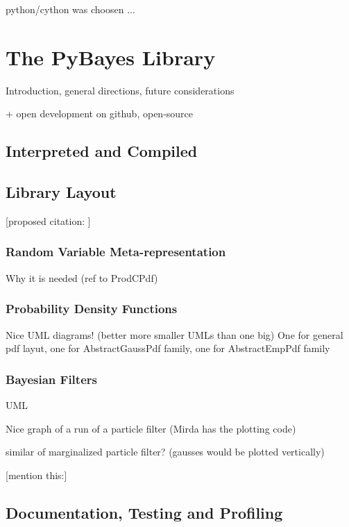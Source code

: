 \documentclass[a4paper,12pt,oneside]{report}
\begin{document}
python/cython was choosen ...


\chapter{The PyBayes Library}

Introduction, general directions, future considerations

+ open development on github, open-source

\section{Interpreted and Compiled}

\section{Library Layout}

[proposed citation: \cite{Smi:05}]

\subsection{Random Variable Meta-representation}

Why it is needed (ref to ProdCPdf)

\subsection{Probability Density Functions}

Nice UML diagrams! (better more smaller UMLs than one big) One for general pdf layut, one for
AbstractGaussPdf family, one for AbstractEmpPdf family

\subsection{Bayesian Filters}

UML

Nice graph of a run of a particle filter (Mirda has the plotting code)

similar of marginalized particle filter? (gausses would be plotted vertically)

[mention this:\cite{Smi:10}]

\section{Documentation, Testing and Profiling}
\end{document}
